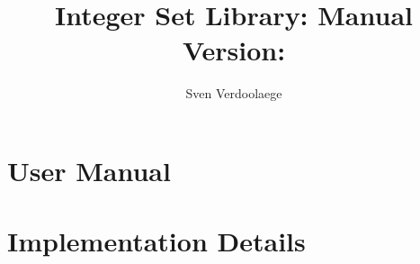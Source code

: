 \documentclass{report}
\numberwithin{theorem}{section}
\numberwithin{def}{section}
\numberwithin{example}{section}
\begin{document}
\title{Integer Set Library: Manual\\
\small Version:  }
\author{Sven Verdoolaege}

\maketitle
\tableofcontents

\chapter{User Manual}



\chapter{Implementation Details}



\printbibliography
\end{document}
